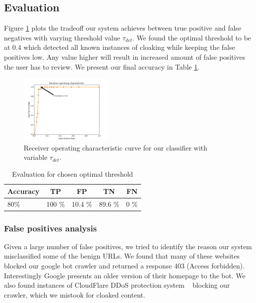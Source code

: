 \documentclass[letterpaper,twocolumn,10pt]{article}
\begin{document}
\subsection{Evaluation}
Figure \ref{fig:roc} plots the tradeoff our system achieves between true positive and false negatives with varying threshold value $\tau_{det}$. We found the optimal threshold to be at $0.4$ which detected all known instances of cloaking while keeping the false positives low. Any value higher will result in increased amount of false positives the user has to review. We present our final accuracy in Table \ref{tab:eval}.

\begin{figure}[ht]
  \centering
  \includegraphics[width=0.4\textwidth]{./proj-roc.png}
  \caption{Receiver operating characteristic curve for our classifier with variable $\tau_{det}$.}
  \label{fig:roc}
\end{figure}



\begin{table}
\begin{center}
\begin{tabular}{|lcccc|}
\hline
{\bf Accuracy} & {\bf TP} & {\bf FP}  & {\bf TN} & {\bf FN}\\
\hline
80\% & 100 \% & 10.4 \% &  89.6 \% & 0 \%\\
\hline
\end{tabular}
\end{center}
\caption{Evaluation for chosen optimal threshold}\label{tab:eval}
\end{table}

\subsubsection{False positives analysis}
Given a large number of false positives, we tried to identify the reason our system misclassified some of the benign URLs. We found that many of these websites blocked our google bot crawler and returned a response 403 (Access forbidden). Interestingly Google presents an older version of their homepage to the bot. We also found instances of CloudFlare DDoS protection system ~\cite{cloudflare} blocking our crawler, which we mistook for cloaked content.
\end{document}
